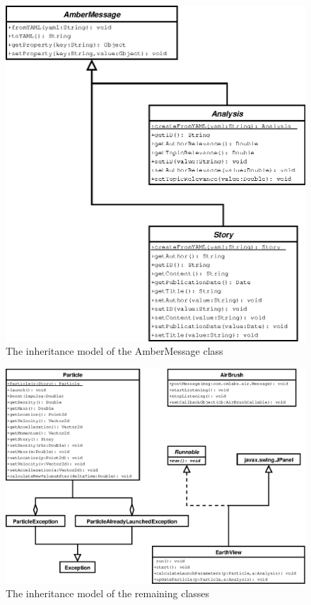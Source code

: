 \begin{figure}[p]
  \centering
  \includegraphics{image/class-diagram-ambermessage}
  \caption{The inheritance model of the AmberMessage class}
  \label{fig:class-diagram-launcher}
\end{figure}

\begin{figure}[p]
  \centering
  \includegraphics{image/class-diagram}
  \caption{The inheritance model of the remaining classes}
  \label{fig:class-diagram-launcher}
\end{figure}












